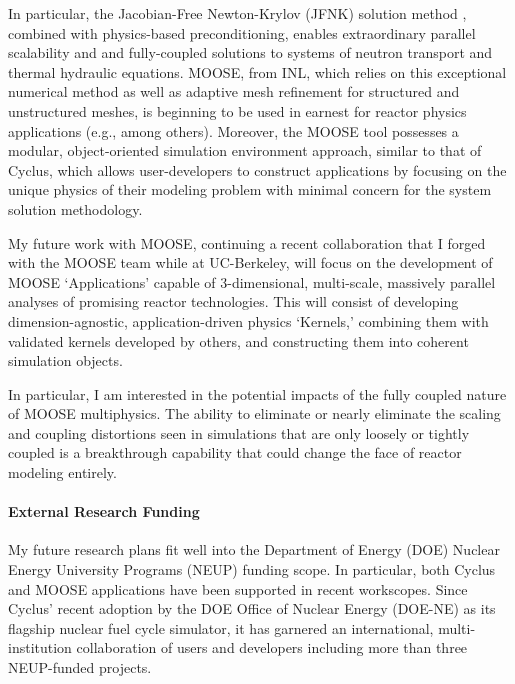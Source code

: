 \documentclass[a4paper, 10pt]{article}
\begin{document}
In particular, the Jacobian-Free Newton-Krylov (JFNK) solution method 
\cite{knoll_jacobian-free_2004}, combined with 
physics-based preconditioning, enables extraordinary parallel scalability and 
and fully-coupled solutions to systems of neutron transport and thermal 
hydraulic equations. MOOSE, from INL, which relies on this exceptional numerical 
method as well as adaptive mesh refinement for structured and 
unstructured meshes, is beginning to be used in earnest for reactor physics 
applications (e.g., \cite{park_tightly_2009, short_multiphysics_2013, 
novascone_assessment_2012, novascone_multidimensional_2012, 
gaston_parallel_2009} among others). Moreover, the MOOSE tool possesses a 
modular, object-oriented simulation environment approach, similar to that of 
Cyclus, which allows user-developers to construct applications by focusing on 
the unique physics of their modeling problem  with minimal concern for the 
system solution methodology. 

My future work with MOOSE, continuing a recent collaboration that I forged with the 
MOOSE team while at UC-Berkeley, will focus on the development 
of MOOSE `Applications' capable of 3-dimensional, multi-scale, massively parallel 
analyses of promising reactor technologies. This will consist of developing 
dimension-agnostic, application-driven physics 
`Kernels,' combining them with validated kernels developed by others, and 
constructing them into coherent simulation objects. 

In particular, I am interested in the potential impacts of the fully coupled 
nature of MOOSE multiphysics. The ability to eliminate or nearly eliminate the 
scaling and coupling distortions seen in simulations that are only loosely or 
tightly coupled is a breakthrough capability that could change the face of 
reactor modeling entirely.  

\paragraph{External Research Funding}
My future research plans fit well into the Department of Energy (DOE) Nuclear 
Energy University Programs (NEUP) funding scope. In particular, both Cyclus and 
MOOSE applications have been supported in recent workscopes. Since Cyclus' 
recent adoption by the DOE Office of Nuclear Energy (DOE-NE)  as its flagship 
nuclear fuel cycle simulator, it has garnered an international, 
multi-institution collaboration of users and developers including more than 
three NEUP-funded projects. 
\end{document}
